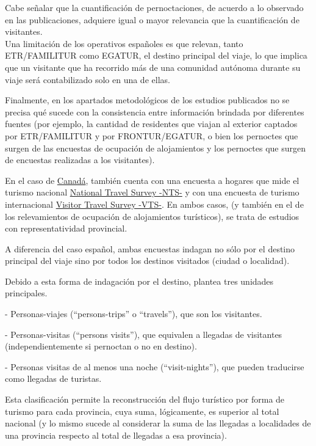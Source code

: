 \documentclass[
  openany]{book}
\begin{document}
Cabe señalar que la cuantificación de pernoctaciones, de acuerdo a lo observado en las publicaciones, adquiere igual o mayor relevancia que la cuantificación de visitantes.\\
Una limitación de los operativos españoles es que relevan, tanto ETR/FAMILITUR como EGATUR, el destino principal del viaje, lo que implica que un visitante que ha recorrido más de una comunidad autónoma durante su viaje será contabilizado solo en una de ellas.

Finalmente, en los apartados metodológicos de los estudios publicados no se precisa qué sucede con la consistencia entre información brindada por diferentes fuentes (por ejemplo, la cantidad de residentes que viajan al exterior captados por ETR/FAMILITUR y por FRONTUR/EGATUR, o bien los pernoctes que surgen de las encuestas de ocupación de alojamientos y los pernoctes que surgen de encuestas realizadas a los visitantes).

En el caso de \href{https://www150.statcan.gc.ca/n1/en/subjects/travel_and_tourism}{Canadá}, también cuenta con una encuesta a hogares que mide el turismo nacional \href{https://www23.statcan.gc.ca/imdb/p2SV.pl?Function=getSurvey\&SDDS=5232}{National Travel Survey -NTS-} y con una encuesta de turismo internacional \href{https://www23.statcan.gc.ca/imdb/p2SV.pl?Function=getSurvey\&SDDS=5261}{Visitor Travel Survey -VTS-}. En ambos casos, (y también en el de los relevamientos de ocupación de alojamientos turísticos), se trata de estudios con representatividad provincial.

A diferencia del caso español, ambas encuestas indagan no sólo por el destino principal del viaje sino por todos los destinos visitados (ciudad o localidad).

Debido a esta forma de indagación por el destino, plantea tres unidades principales.

- Personas-viajes (``persons-trips'' o ``travels''), que son los visitantes.

- Personas-visitas (``persons visits''), que equivalen a llegadas de visitantes (independientemente si pernoctan o no en destino).

- Personas visitas de al menos una noche (``visit-nights''), que pueden traducirse como llegadas de turistas.

Esta clasificación permite la reconstrucción del flujo turístico por forma de turismo para cada provincia, cuya suma, lógicamente, es superior al total nacional (y lo mismo sucede al considerar la suma de las llegadas a localidades de una provincia respecto al total de llegadas a esa provincia).
\end{document}
